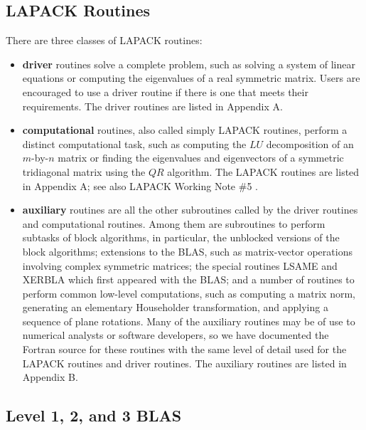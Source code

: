 \subsection{LAPACK Routines}

\hspace{\parindent}
There are three classes of LAPACK routines:
\begin{itemize}

\item {\bf driver} routines solve a complete problem, such as solving
a system of linear equations or computing the eigenvalues of a real
symmetric matrix.  Users are encouraged to use a driver routine if there
is one that meets their requirements.  The driver routines are listed
in Appendix A.

\item {\bf computational} routines, also called simply LAPACK routines,
perform a distinct computational task, such as computing
the $LU$ decomposition of an $m$-by-$n$ matrix or finding the
eigenvalues and eigenvectors of a symmetric tridiagonal matrix using
the $QR$ algorithm. 
The LAPACK routines are listed in Appendix A; see also LAPACK Working
Note \#5 \cite{WN5}.

\item {\bf auxiliary} routines are all the other subroutines called
by the driver routines and computational routines.  
Among them are subroutines to perform subtasks of block algorithms,
in particular, the unblocked versions of the block algorithms;
extensions to the BLAS, such as matrix-vector operations involving
complex symmetric matrices;
the special routines LSAME and XERBLA which first appeared with the
BLAS;
and a number of routines to perform common low-level computations,
such as computing a matrix norm, generating an elementary Householder
transformation, and applying a sequence of plane rotations.
Many of the auxiliary routines may be of use to numerical analysts
or software developers, so we have documented the Fortran source for
these routines with the same level of detail used for the LAPACK
routines and driver routines.
The auxiliary routines are listed in Appendix B.
\end{itemize}

\subsection{Level 1, 2, and 3 BLAS}

